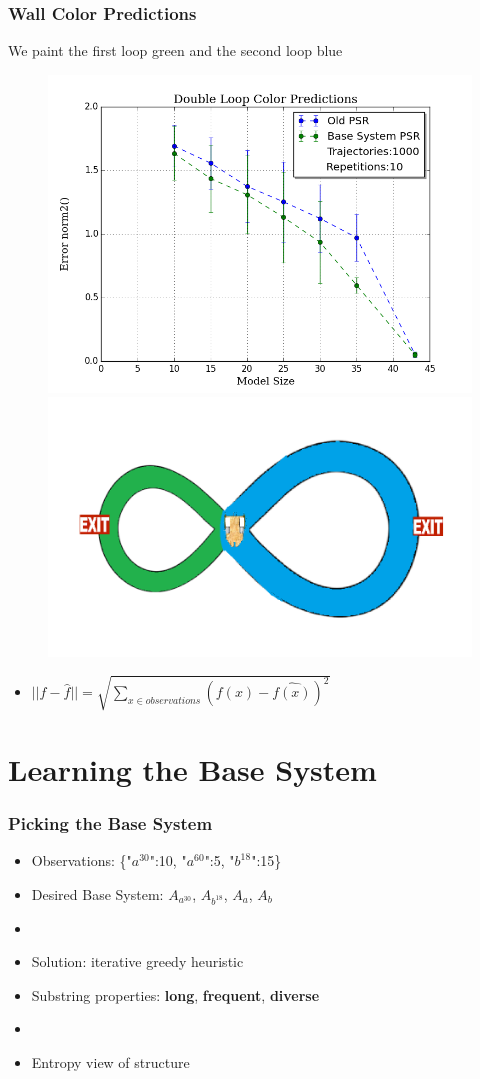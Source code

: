\documentclass{beamer}
\begin{document}
\begin{frame}
\frametitle{Wall Color Predictions}
We paint the first loop green and the second loop blue
\begin{figure}
\includegraphics[width=0.6\linewidth]{uCOREPICS/MultipleObservations.png}
\includegraphics[width=0.4\linewidth]{lucasplots/monImages/doubleLoopImageMO.png}

\end{figure}

\begin{itemize}

\item[] $||f - \hat{f}|| = \sqrt{\sum\nolimits_{x \in observations}(f(x) - \hat{f(x)})^2}$ 
\end{itemize}

\end{frame}



\section{Learning the Base System}

\begin{frame}
\frametitle{Picking the Base System}
\begin{itemize}


\item Observations: \{"$a^{30}$":10, "$a^{60}$":5, "$b^{18}$":15\}

\item[] Desired Base System: $A_{a^{30}}$, $A_{b^{18}}$, $A_a$, $A_b$
\item[]

\item Solution: iterative greedy heuristic 
\item Substring properties: 
\textbf{long}, \textbf{frequent}, \textbf{diverse}
\item[]
\item Entropy view of structure


\end{itemize}
\end{frame}
\end{document}
